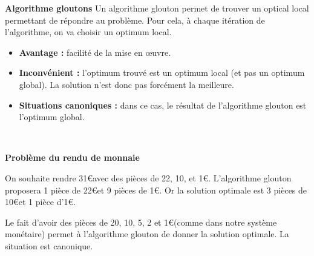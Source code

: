 \begin{defi} \footnotesize \textbf{\textsf{Algorithme gloutons}} \normalsize
Un algorithme glouton permet de trouver un optical local permettant de répondre au problème. Pour cela, à chaque itération de l'algorithme, on va choisir un optimum local.

\begin{itemize}
\item \textbf{Avantage : } facilité de la mise en \oe{}uvre. 
\item \textbf{Inconvénient : } l'optimum trouvé est un optimum local (et pas un optimum global). La solution n'est donc pas forcément la meilleure.
\item \textbf{Situations canoniques :} dans ce cas, le résultat de l'algorithme glouton est l'optimum global. 
\end{itemize}

\end{defi}

\begin{exemple} ~\\

\vspace{-.5cm}

\textbf{Problème du rendu de monnaie} 

On souhaite rendre 31\euro avec des pièces de 22, 10, et 1\euro. L'algorithme glouton proposera 1 pièce de 22\euro et 9 pièces de 1\euro. Or la solution optimale est 3 pièces de 10\euro et 1 pièce d'1\euro.

Le fait d'avoir des pièces de 20, 10, 5, 2 et 1\euro (comme dans notre système monétaire) permet à l'algorithme glouton de donner la solution optimale. La situation est canonique.
\end{exemple}

%

